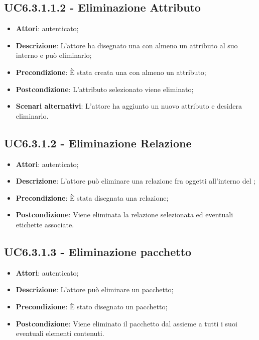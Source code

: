 \subsection{UC6.3.1.1.2 - Eliminazione Attributo}
\label{ssec:UC6.3.1.1.2}
\begin{itemize}
\item \textbf{Attori}:  autenticato;
\item \textbf{Descrizione}: L'attore ha disegnato una  con almeno un attributo al suo interno e può eliminarlo;
\item \textbf{Precondizione}: È stata creata una  con almeno un attributo;
\item \textbf{Postcondizione}: L'attributo selezionato viene eliminato;
\item \textbf{Scenari alternativi}: L'attore ha aggiunto un nuovo attributo e desidera eliminarlo.
\end{itemize}
\subsection{UC6.3.1.2 - Eliminazione Relazione}
\label{ssec:UC6.3.1.2}
\begin{itemize}
\item \textbf{Attori}:  autenticato;
\item \textbf{Descrizione}: L'attore può eliminare una relazione fra oggetti all'interno del ;
\item \textbf{Precondizione}: È stata disegnata una relazione;
\item \textbf{Postcondizione}: Viene eliminata la relazione selezionata ed eventuali etichette associate.
\end{itemize}
\subsection{UC6.3.1.3 - Eliminazione pacchetto}
\label{ssec:UC6.3.1.3}
\begin{itemize}
\item \textbf{Attori}:  autenticato;
\item \textbf{Descrizione}: L'attore può eliminare un pacchetto;
\item \textbf{Precondizione}: È stato disegnato un pacchetto;
\item \textbf{Postcondizione}: Viene eliminato il pacchetto dal  assieme a tutti i suoi eventuali elementi contenuti.
\end{itemize}
